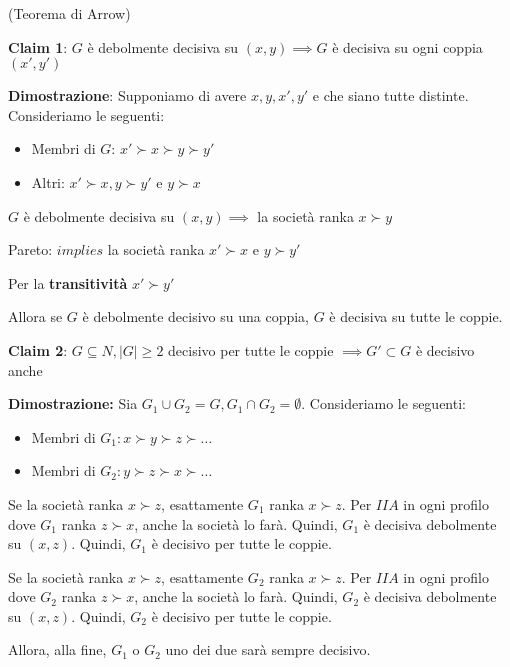 \begin{dimostrazione}
    (Teorema di Arrow)
    
    \textbf{Claim 1}: $G$ è debolmente decisiva su $(x,y) \implies G$ è decisiva su ogni coppia $(x', y')$
    
    \textbf{Dimostrazione}:
    Supponiamo di avere $x,y,x',y'$ e che siano tutte distinte. Consideriamo le seguenti:
    \begin{itemize}
        \item Membri di $G$: $x' \succ x \succ y \succ y'$
        \item Altri: $x' \succ x,y \succ y'$ e $y \succ x$
    \end{itemize}

    $G$ è debolmente decisiva su $(x,y) \implies $ la società ranka $x \succ y$

    Pareto: $implies$ la società ranka $x' \succ x$ e $y \succ y'$

    Per la \textbf{transitività} $x' \succ y'$

    Allora se $G$ è debolmente decisivo su una coppia, $G$ è decisiva su tutte le coppie.

    \textbf{Claim 2}: $G \subseteq N, |G| \geq 2$ decisivo per tutte le coppie $\implies G' \subset G$ è decisivo anche

    \textbf{Dimostrazione:}
    Sia $G_1 \cup G_2 = G,G_1 \cap G_2 = \emptyset$. Consideriamo le seguenti:

    \begin{itemize}
        \item Membri di $G_1: x \succ y \succ z \succ \dots$
        \item Membri di $G_2: y \succ z \succ x \succ \dots$
    \end{itemize}
    Se la società ranka $x \succ z$, esattamente $G_1$ ranka $x \succ z$. Per $IIA$ in ogni profilo dove $G_1$ ranka $z \succ x$, 
    anche la società lo farà. Quindi, $G_1$ è decisiva debolmente su $(x,z)$. Quindi, $G_1$ è decisivo per tutte le coppie.
    
    Se la società ranka $x \succ z$, esattamente $G_2$ ranka $x \succ z$. Per $IIA$ in ogni profilo dove $G_2$ ranka $z \succ x$, 
    anche la società lo farà. Quindi, $G_2$ è decisiva debolmente su $(x,z)$. Quindi, $G_2$ è decisivo per tutte le coppie.
    
    Allora, alla fine, $G_1$ o $G_2$ uno dei due sarà sempre decisivo.
\end{dimostrazione}


